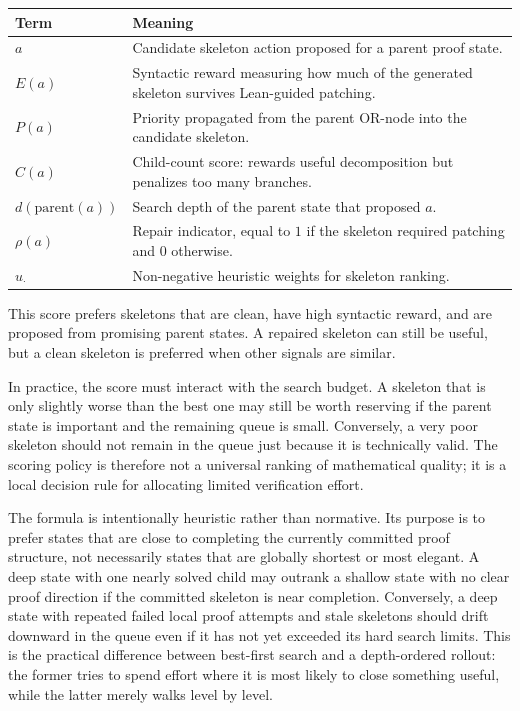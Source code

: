\begin{center}
\small
\renewcommand{\arraystretch}{1.18}
\begin{tabular}{@{}p{}p{}@{}}
\toprule
Term & Meaning \\
\midrule
\(a\) & Candidate skeleton action proposed for a parent proof state. \\
\(E(a)\) & Syntactic reward measuring how much of the generated skeleton survives Lean-guided patching. \\
\(P(a)\) & Priority propagated from the parent OR-node into the candidate skeleton. \\
\(C(a)\) & Child-count score: rewards useful decomposition but penalizes too many branches. \\
\(d(\mathrm{parent}(a))\) & Search depth of the parent state that proposed \(a\). \\
\(\rho(a)\) & Repair indicator, equal to \(1\) if the skeleton required patching and \(0\) otherwise. \\
\(u_\cdot\) & Non-negative heuristic weights for skeleton ranking. \\
\bottomrule
\end{tabular}
\end{center}

This score prefers skeletons that are clean, have high syntactic reward, and are proposed from
promising parent states. A repaired skeleton can still be useful, but a clean skeleton is preferred when
other signals are similar.

In practice, the score must interact with the search budget. A skeleton that is only slightly worse than
the best one may still be worth reserving if the parent state is important and the remaining queue is small.
Conversely, a very poor skeleton should not remain in the queue just because it is technically valid. The
scoring policy is therefore not a universal ranking of mathematical quality; it is a local decision rule for
allocating limited verification effort.

The formula is intentionally heuristic rather than normative. Its purpose is to prefer states that are
close to completing the currently committed proof structure, not necessarily states that are globally
shortest or most elegant. A deep state with one nearly solved child may outrank a shallow state with no
clear proof direction if the committed skeleton is near completion. Conversely, a deep state with repeated
failed local proof attempts and stale skeletons should drift downward in the queue even if it has not yet exceeded its
hard search limits. This is the practical difference between best-first search and a depth-ordered rollout:
the former tries to spend effort where it is most likely to close something useful, while the latter merely
walks level by level.

